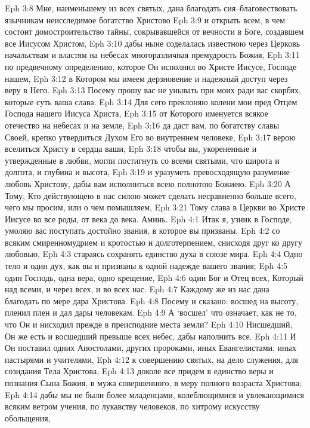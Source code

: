 Eph 3:8  Мне, наименьшему из всех святых, дана благодать сия--благовествовать язычникам неисследимое богатство Христово
Eph 3:9  и открыть всем, в чем состоит домостроительство тайны, сокрывавшейся от вечности в Боге, создавшем все Иисусом Христом,
Eph 3:10  дабы ныне соделалась известною через Церковь начальствам и властям на небесах многоразличная премудрость Божия,
Eph 3:11  по предвечному определению, которое Он исполнил во Христе Иисусе, Господе нашем,
Eph 3:12  в Котором мы имеем дерзновение и надежный доступ через веру в Него.
Eph 3:13  Посему прошу вас не унывать при моих ради вас скорбях, которые суть ваша слава.
Eph 3:14  Для сего преклоняю колени мои пред Отцем Господа нашего Иисуса Христа,
Eph 3:15  от Которого именуется всякое отечество на небесах и на земле,
Eph 3:16  да даст вам, по богатству славы Своей, крепко утвердиться Духом Его во внутреннем человеке,
Eph 3:17  верою вселиться Христу в сердца ваши,
Eph 3:18  чтобы вы, укорененные и утвержденные в любви, могли постигнуть со всеми святыми, что широта и долгота, и глубина и высота,
Eph 3:19  и уразуметь превосходящую разумение любовь Христову, дабы вам исполниться всею полнотою Божиею.
Eph 3:20  А Тому, Кто действующею в нас силою может сделать несравненно больше всего, чего мы просим, или о чем помышляем,
Eph 3:21  Тому слава в Церкви во Христе Иисусе во все роды, от века до века. Аминь.
Eph 4:1  Итак я, узник в Господе, умоляю вас поступать достойно звания, в которое вы призваны,
Eph 4:2  со всяким смиренномудрием и кротостью и долготерпением, снисходя друг ко другу любовью,
Eph 4:3  стараясь сохранять единство духа в союзе мира.
Eph 4:4  Одно тело и один дух, как вы и призваны к одной надежде вашего звания;
Eph 4:5  один Господь, одна вера, одно крещение,
Eph 4:6  один Бог и Отец всех, Который над всеми, и через всех, и во всех нас.
Eph 4:7  Каждому же из нас дана благодать по мере дара Христова.
Eph 4:8  Посему и сказано: восшед на высоту, пленил плен и дал дары человекам.
Eph 4:9  А `восшел' что означает, как не то, что Он и нисходил прежде в преисподние места земли?
Eph 4:10  Нисшедший, Он же есть и восшедший превыше всех небес, дабы наполнить все.
Eph 4:11  И Он поставил одних Апостолами, других пророками, иных Евангелистами, иных пастырями и учителями,
Eph 4:12  к совершению святых, на дело служения, для созидания Тела Христова,
Eph 4:13  доколе все придем в единство веры и познания Сына Божия, в мужа совершенного, в меру полного возраста Христова;
Eph 4:14  дабы мы не были более младенцами, колеблющимися и увлекающимися всяким ветром учения, по лукавству человеков, по хитрому искусству обольщения,
